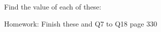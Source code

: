 \documentclass[12pt, a4paper, addpoints]{exam}
\begin{document}
\begin{questions}
\begin{multicols}{5}
\end{multicols}


\question Find the value of each of these:
\begin{multicols}{6}
\end{multicols}










\question  Homework: Finish these and Q7 to Q18 page 330



\end{questions}
\end{document}
